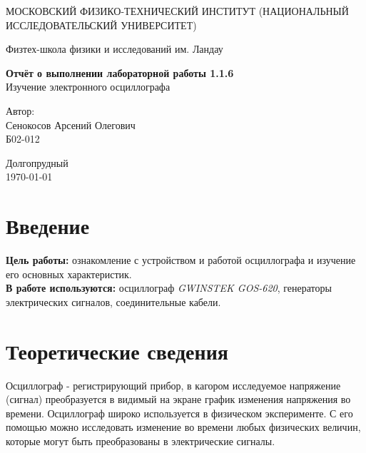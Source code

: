 \documentclass[a4paper,12pt]{article} %
\date{\today}
\begin{document}
\begin{titlepage}
	\begin{center}
		{\large МОСКОВСКИЙ ФИЗИКО-ТЕХНИЧЕСКИЙ ИНСТИТУТ (НАЦИОНАЛЬНЫЙ ИССЛЕДОВАТЕЛЬСКИЙ УНИВЕРСИТЕТ)}
	\end{center}
	\begin{center}
		{\large Физтех-школа физики и исследований им. Ландау}
	\end{center}
	
	
	\vspace{4.5cm}
	{\huge
		\begin{center}
			{\bf Отчёт о выполнении лабораторной работы 1.1.6}\\
				Изучение электронного осциллографа
		\end{center}
	}
	\vspace{2cm}
	\begin{flushright}
		{\LARGE Автор:\\ Сенокосов Арсений Олегович \\
			\vspace{0.2cm}
			Б02-012}
	\end{flushright}
	\vspace{8cm}
	\begin{center}
		Долгопрудный\\
		\today
	\end{center}
\end{titlepage}

\section{Введение}

\textbf{Цель работы:} ознакомление с устройством и работой осциллографа и изучение его основных характеристик.\\
\textbf{В работе используются:} осциллограф \textit{GWINSTEK GOS-620}, генераторы электрических сигналов, соединительные кабели.

\section{Теоретические сведения}

Осциллограф - регистрирующий прибор, в кагором исследуемое напряжение (сигнал) преобразуется в видимый на экране график изменения напряжения во времени. Осциллограф широко используется в физическом эксперименте. С его помощью можно исследовать изменение во времени любых физических величин, которые могут быть преобразованы в электрические сигналы.
\end{document}
